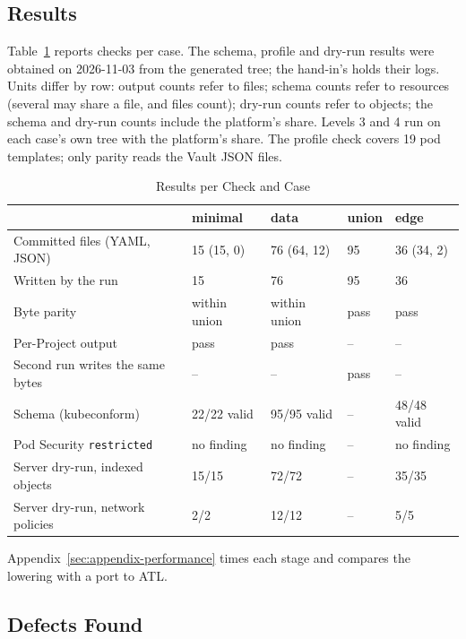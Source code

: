 \subsection{Results}
\label{sec:results}

Table~\ref{tab:results} reports checks per case. The schema, profile and dry-run
results were obtained on 2026-11-03 from the generated tree; the hand-in's  holds their logs. Units differ by row:
output counts refer to files; schema counts refer to resources (several may share
a file, and  files count); dry-run counts
refer to objects; the schema and dry-run counts include the platform's share. Levels 3 and 4 run on
each case's own tree with the platform's share. The profile check covers 19 pod templates; only parity reads the Vault JSON files.

\begin{table}[!htbp]
\centering
\small
\begin{tabular}{p{4.6cm}p{2.3cm}p{2.3cm}p{2.3cm}p{2.3cm}}
\hline
& \textbf{minimal} & \textbf{data} & \textbf{union} & \textbf{edge} \\
\hline
Committed files (YAML, JSON) & 15 (15, 0) & 76 (64, 12) & 95 & 36 (34, 2) \\
Written by the run & 15 & 76 & 95 & 36 \\
Byte parity & within union & within union & pass & pass \\
Per-Project output & pass & pass & -- & -- \\
Second run writes the same bytes & -- & -- & pass & -- \\
Schema (kubeconform) & 22/22 valid & 95/95 valid & -- & 48/48 valid \\
Pod Security \texttt{restricted} & no finding & no finding & -- & no finding \\
Server dry-run, indexed objects & 15/15 & 72/72 & -- & 35/35 \\
Server dry-run, network policies & 2/2 & 12/12 & -- & 5/5 \\
\hline
\end{tabular}
\caption{Results per Check and Case}
\label{tab:results}
\end{table}

Appendix~\ref{sec:appendix-performance} times each stage and compares the lowering with a port to ATL.

\subsection{Defects Found}
\label{sec:defects}

